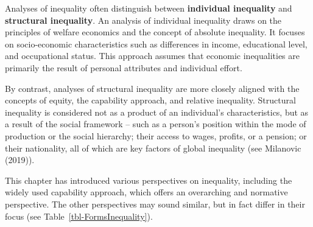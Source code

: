 \documentclass[
  a4paper,
  openany]{book}
\begin{document}
Analyses of inequality often distinguish between \textbf{individual
inequality} and \textbf{structural inequality}. An analysis of
individual inequality draws on the principles of welfare economics and
the concept of absolute inequality. It focuses on socio-economic
characteristics such as differences in income, educational level, and
occupational status. This approach assumes that economic inequalities
are primarily the result of personal attributes and individual effort.

By contrast, analyses of structural inequality are more closely aligned
with the concepts of equity, the capability approach, and relative
inequality. Structural inequality is considered not as a product of an
individual's characteristics, but as a result of the social framework --
such as a person's position within the mode of production or the social
hierarchy; their access to wages, profits, or a pension; or their
nationality, all of which are key factors of global inequality (see
Milanovic (2019)).

This chapter has introduced various perspectives on inequality,
including the widely used capability approach, which offers an
overarching and normative perspective. The other perspectives may sound
similar, but in fact differ in their focus (see
Table~\ref{tbl-FormsInequality}).
\end{document}
